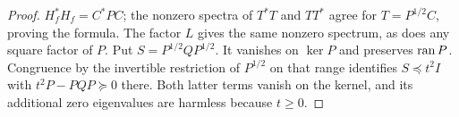 \begin{proof}
$H_f^*H_f=C^*PC$; the nonzero spectra of $T^*T$ and $TT^*$ agree for $T=P^{1/2}C$, proving the formula. The factor $L$ gives the same nonzero spectrum, as does any square factor of $P$. Put $S=P^{1/2}QP^{1/2}$. It vanishes on $\ker P$ and preserves $\operatorname{ran} P$. Congruence by the invertible restriction of $P^{1/2}$ on that range identifies $S\preceq t^2I$ with $t^2P-PQP\succeq0$ there. Both latter terms vanish on the kernel, and its additional zero eigenvalues are harmless because $t\ge0$.
\end{proof}
